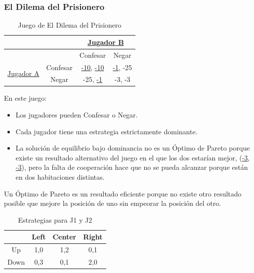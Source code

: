 \documentclass{article}
\newcommand{\ulcolor}[2][Red]{\setulcolor{#1}\ul{#2}}
\begin{document}
            \subsubsection*{El Dilema del Prisionero}
                \begin{table}[h]
                    \centering
                        \begin{tabular}{|c|c|c|c|}
                        \hline
                                                & & \multicolumn{2}{c|}{\ulcolor[Blue]{Jugador B}}  \\ \hline
                                                & & Confesar & Negar  \\ \hline
                        \multirow{2}{*}{\ulcolor[Red]{Jugador A}} 
                                                & Confesar & \ulcolor[Red]{-10}, \ulcolor[Blue]{-10} & \ulcolor[Red]{-1}, -25 \\ \cline{2-4} 
                                                & Negar & -25, \ulcolor[Blue]{-1} & -3, -3 \\\hline
                        \end{tabular}
                    \caption{Juego de El Dilema del Prisionero}
                \end{table}
                En este juego:
                \begin{itemize}
                    \item Los jugadores pueden Confesar o Negar.
                    \item Cada jugador tiene una estrategia estrictamente dominante.
                    \item La solución de equilibrio bajo dominancia no es un Óptimo de Pareto porque existe un resultado alternativo del juego en el que los dos estarían mejor, (\ulcolor[Red]{-3}, \ulcolor[Blue]{-3}), pero la falta de cooperación hace que no se pueda alcanzar porque están en dos habitaciones distintas.
                \end{itemize}
                Un Óptimo de Pareto es un resultado eficiente porque no existe otro resultado posible que mejore la posición de uno sin empeorar la posición del otro.
                \begin{table}[h]
                    \centering
                    \begin{tabular}{|c|c|c|c|}
                        \hline
                            & Left  & Center    & Right \\ \hline
                        Up  & 1,0   & 1,2       & 0,1   \\ \hline
                        Down& 0,3   & 0,1       & 2,0   \\ \hline
                    \end{tabular}
                    \caption{Estrategias para J1 y J2}
                \end{table}
\end{document}
